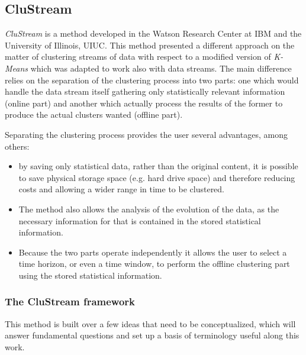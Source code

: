 \subsection{CluStream}
\textit{CluStream} is a method developed in the Watson Research Center at IBM and the University of Illinois, UIUC. This method presented a different approach on the matter of clustering streams of data with respect to a modified version of \textit{K-Means} which was adapted to work also with data streams. The main difference relies on the separation of the clustering process into two parts: one which would handle the data stream itself gathering only statistically relevant information (online part) and another which actually process the results of the former to produce the actual clusters wanted (offline part). 

Separating the clustering process provides the user several advantages, among others:

\begin{itemize}
 \item by saving only statistical data, rather than the original content, it is possible to save physical storage space (e.g. hard drive space) and therefore reducing costs and allowing a wider range in time to be clustered.
 
 \item The method also allows the analysis of the evolution of the data, as the necessary information for that is contained in the stored statistical information.
 
 \item Because the two parts operate independently it allows the user to select a time horizon, or even a time window, to perform the offline clustering part using the stored statistical information.
\end{itemize}

\subsubsection{The CluStream framework}

This method is built over a few ideas that need to be conceptualized, which will answer fundamental questions and set up a basis of terminology useful along this work.

